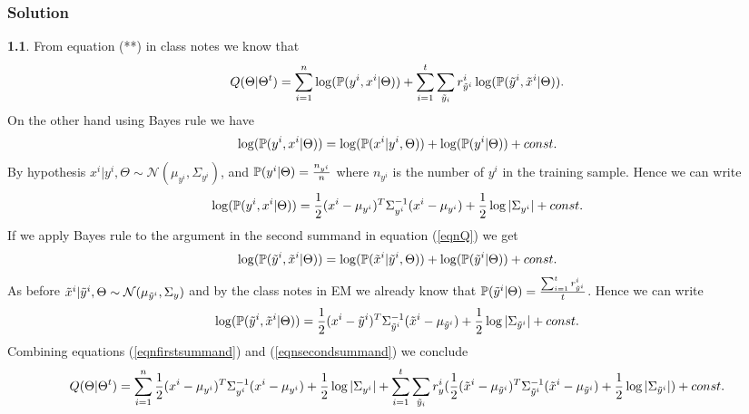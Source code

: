 \documentclass{article}
\begin{document}
\subsubsection*{Solution}
\textbf{1.1}. 
\newline
From equation (**) in class notes we know that 
\begin{equation}\label{eqnQ}
Q(\Theta|\Theta^{t})=\sum_{i=1}^{n}\log(\mathbb{P}(y^{i},x^{i}|\Theta))+\sum_{i=1}^{t}\sum_{\tilde{y}_{i}}r^{i}_{\tilde{y}^{i}}\log(\mathbb{P}(\tilde{y}^{i},\tilde{x}^{i}|\Theta)).
\end{equation}
On the other hand using Bayes rule we have
\begin{equation*}
\log(\mathbb{P}(y^{i},x^{i}|\Theta))=\log(\mathbb{P}(x^{i}|y^{i},\Theta))+\log(\mathbb{P}(y^{i}|\Theta))+const.
\end{equation*}
By hypothesis $x^{i}|y^{i},\Theta\sim\mathcal{N}(\mu_{y^{i}},\Sigma_{y^{i}})$, and $\mathbb{P}(y^{i}|\Theta)=\frac{n_{y^{i}}}{n}$ where $n_{y^{i}}$ is the number of $y^{i}$ in the training sample. Hence we can write
\begin{equation}\label{eqnfirstsummand}
\log(\mathbb{P}(y^{i},x^{i}|\Theta))=\frac{1}{2}(x^{i}-\mu_{y^{i}})^{T}\Sigma_{y^{i}}^{-1}(x^{i}-\mu_{y^{i}})+\frac{1}{2}\log|\Sigma_{y^{i}}|+const.
\end{equation}
If we apply Bayes rule to the argument in the second summand in equation (\ref{eqnQ}) we get
\begin{equation*}
\log(\mathbb{P}(\tilde{y}^{i},\tilde{x}^{i}|\Theta))=\log(\mathbb{P}(\tilde{x}^{i}|\tilde{y}^{i},\Theta))+\log(\mathbb{P}(\tilde{y}^{i}|\Theta))+const.
\end{equation*}
As before $\tilde{x}^{i}|\tilde{y}^{i},\Theta\sim\mathcal{N}(\mu_{\tilde{y}^{i}},\Sigma_{\\y})$ and by the class notes in EM we already  know that $\mathbb{P}(\tilde{y}^{i}|\Theta)=\frac{\sum_{i=1}^{t}r^{i}_{\tilde{y}^{i}}}{t}$. Hence we can write
\begin{equation}\label{eqnsecondsummand}
\log(\mathbb{P}(\tilde{y}^{i},\tilde{x}^{i}|\Theta))=\frac{1}{2}(x^{i}-\tilde{y}^{i})^{T}\Sigma_{\tilde{y}^{i}}^{-1}(\tilde{x}^{i}-\mu_{\tilde{y}^{i}})+\frac{1}{2}\log|\Sigma_{\tilde{y}^{i}}|+const.
\end{equation}
Combining equations (\ref{eqnfirstsummand}) and (\ref{eqnsecondsummand}) we conclude
\begin{equation*}
Q(\Theta|\Theta^{t})=\sum_{i=1}^{n}\frac{1}{2}(x^{i}-\mu_{y^{i}})^{T}\Sigma_{y^{i}}^{-1}(x^{i}-\mu_{y^{i}})+\frac{1}{2}\log|\Sigma_{y^{i}}|+
\sum_{i=1}^{t}\sum_{\tilde{y}_{i}}r^{i}_{\\y}(\frac{1}{2}(\tilde{x}^{i}-\mu_{\tilde{y}^{i}})^{T}\Sigma_{\tilde{y}^{i}}^{-1}(\tilde{x}^{i}-\mu_{\tilde{y}^{i}})+\frac{1}{2}\log|\Sigma_{\tilde{y}^{i}}|)+const.
\end{equation*}
\end{document}
